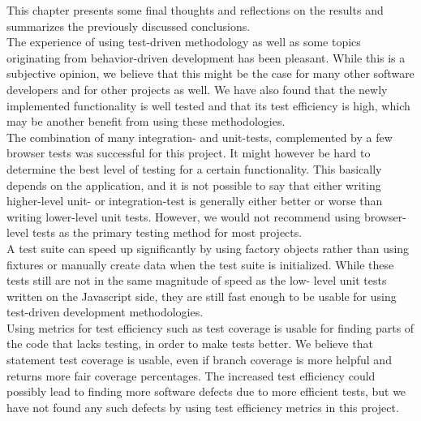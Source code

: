 This chapter presents some final thoughts and reflections on the results
and summarizes the previously discussed conclusions.\\

The experience of using test-driven methodology as well as some topics
originating from behavior-driven development has been pleasant. While
this is a subjective opinion, we believe that this might be the case for
many other software developers and for other projects as well. We have
also found that the newly implemented functionality is well tested and
that its test efficiency is high, which may be another benefit from
using these methodologies.\\

The combination of many integration- and unit-tests, complemented by a
few browser tests was successful for this project. It might however be
hard to determine the best level of testing for a certain functionality.
This basically depends on the application, and it is not possible to say
that either writing higher-level unit- or integration-test is generally
either better or worse than writing lower-level unit tests. However, we
would not recommend using browser-level tests as the primary testing
method for most projects.\\

A test suite can speed up significantly by using factory objects rather
than using fixtures or manually create data when the test suite is
initialized. While these tests still are not in the same magnitude of
speed as the low- level unit tests written on the Javascript side, they
are still fast enough to be usable for using test-driven development
methodologies.\\

Using metrics for test efficiency such as test coverage is usable for
finding parts of the code that lacks testing, in order to make tests
better. We believe that statement test coverage is usable, even if
branch coverage is more helpful and returns more fair coverage
percentages. The increased test efficiency could possibly lead to
finding more software defects due to more efficient tests, but we have
not found any such defects by using test efficiency metrics in this
project.\\

